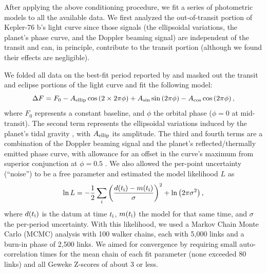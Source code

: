 \documentclass[manuscript]{aastex62}
\begin{document}
After applying the above conditioning procedure, we fit a series of photometric models to all the available data. We first analyzed the out-of-transit portion of Kepler-76 b's light curve since those signals (the ellipsoidal variations, the planet's phase curve, and the Doppler beaming signal) are independent of the transit and can, in principle, contribute to the transit portion (although we found their effects are negligible). 

We folded all data on the best-fit period reported by \citet{2013ApJ...771...26F} and masked out the transit and eclipse portions of the light curve and fit the following model:
\begin{equation}
    \Delta F = F_0 - A_{\rm ellip} \cos \left(2\times2\pi\phi \right) + A_{\rm sin} \sin \left(2 \pi\phi \right) - A_{\rm cos} \cos \left(2\pi \phi \right),
\label{eqn:BEER_curve}
\end{equation}
where $F_0$ represents a constant baseline, and $\phi$ the orbital phase ($\phi = 0$ at mid-transit). The second term represents the ellipsoidal variations induced by the planet's tidal gravity \citep{2010ApJ...713L.145W}, with $A_{\rm ellip}$ its amplitude. The third and fourth terms are a combination of the Doppler beaming signal \citep{2003ApJ...588L.117L} and the planet's reflected/thermally emitted phase curve, with allowance for an offset in the curve's maximum from superior conjunction at $\phi = 0.5$ \citep{2013ApJ...771...26F}. We also allowed the per-point uncertainty (``noise'') to be a free parameter and estimated the model likelihood $L$ as
\begin{equation}
    \ln L = -\frac{1}{2} \sum_i \bigg( \frac{ d(t_{\rm i}) - m(t_{\rm i}) }{\sigma} \bigg)^2 + \ln \left( 2 \pi \sigma^2 \right),
    \label{eqn:likelihood}
\end{equation}
where $d(t_{\rm i})$ is the datum at time $t_{\rm i}$, $m(t_{\rm i})$ the model for that same time, and $\sigma$ the per-period uncertainty. With this likelihood, we used a Markov Chain Monte Carlo (MCMC) analysis \citep{2013PASP..125..306F} with 100 walker chains, each with 5,000 links and a burn-in phase of 2,500 links. We aimed for convergence by requiring small auto-correlation times \citep[e.g.,][]{geyer1992} for the mean chain of each fit parameter (none exceeded 80 links) and all Geweke Z-scores \citep{Geweke92evaluatingthe} of about 3 or less. 
\end{document}

